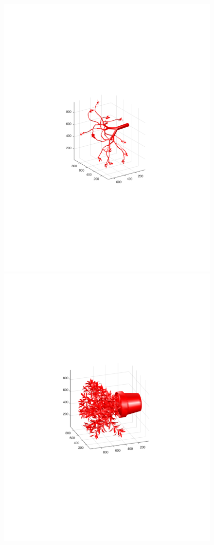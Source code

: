 \documentclass{UCF_ETD}
\begin{document}
\begin{figure}[H]
\begin{center}
\includegraphics[scale=0.4]{RobustRegistration/LeavelessTree}
\includegraphics[scale=0.4]{RobustRegistration/PotPlant}

\end{center}
\end{figure}
\end{document}
